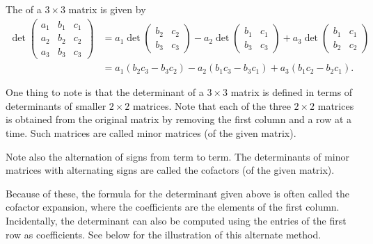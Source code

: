 \documentclass{ximera}
\begin{document}
\begin{definition}
  The  of a $3 \times 3$ matrix is given by
  \begin{align*}
    \det\begin{pmatrix}
      a_1 &  b_1 & c_1 \\
      a_2 &  b_2 & c_2 \\
      a_3 &  b_3 & c_3
    \end{pmatrix}
    & =
      a_1 \det
      \begin{pmatrix}
        b_2 & c_2 \\
        b_3 & c_3
      \end{pmatrix}
      - a_2 \det
      \begin{pmatrix}
        b_1 & c_1 \\
        b_3 & c_3
      \end{pmatrix}
      + a_3 \det
      \begin{pmatrix}
        b_1 & c_1 \\
        b_2 & c_2
      \end{pmatrix} \\
          & = a_1(b_2c_3 - b_3c_2) - a_2(b_1c_3 - b_3c_1) + a_3(b_1c_2 - b_2c_1).
  \end{align*}
\end{definition}

One thing to note is that the determinant of a $3 \times 3$ matrix is
defined in terms of determinants of smaller $2 \times 2$ matrices. Note
that each of the three $2 \times 2$ matrices is obtained from the original
matrix by removing the first column and a row at a time. Such matrices
are called minor matrices (of the given matrix).

Note also the alternation of signs from term to term. The determinants
of minor matrices with alternating signs are called the cofactors (of
the given matrix).

Because of these, the formula for the determinant given above is
often called the cofactor expansion, where the coefficients are the
elements of the first column. Incidentally, the determinant can also
be computed using the entries of the first row as coefficients. See
below for the illustration of this alternate method.
\end{document}
